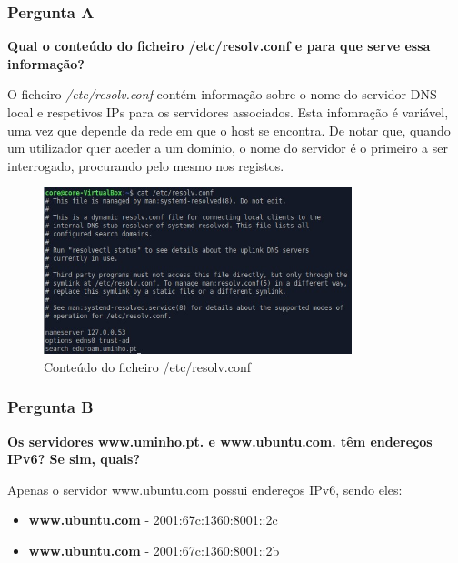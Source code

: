 \documentclass[11pt]{article}
\begin{document}
\subsubsection{Pergunta A}

\textbf{Qual o conteúdo do ficheiro /etc/resolv.conf e para que serve essa informação?}

\par O ficheiro \textit{/etc/resolv.conf} contém informação sobre o nome do servidor DNS local e respetivos IPs para os servidores associados. Esta infomração é variável, uma vez que depende da rede em que o host se encontra. De notar que, quando um utilizador quer aceder a um domínio, o nome do servidor é o primeiro a ser interrogado, procurando pelo mesmo nos registos.

\begin{figure}[!htb]
    \centering
    \includegraphics[width=0.8\textwidth]{images/Parte1/p1_a.jpg}
    \caption{Conteúdo do ficheiro /etc/resolv.conf}
    \label{fig:etc/conf}
\end{figure}

\subsubsection{Pergunta B}

\textbf{Os servidores www.uminho.pt. e www.ubuntu.com. têm endereços IPv6? Se sim, quais?}

\par Apenas o servidor www.ubuntu.com possui endereços IPv6, sendo eles:
\begin{itemize}
    \item \textbf{www.ubuntu.com} - 2001:67c:1360:8001::2c
    \item \textbf{www.ubuntu.com} - 2001:67c:1360:8001::2b
\end{itemize}
\end{document}
